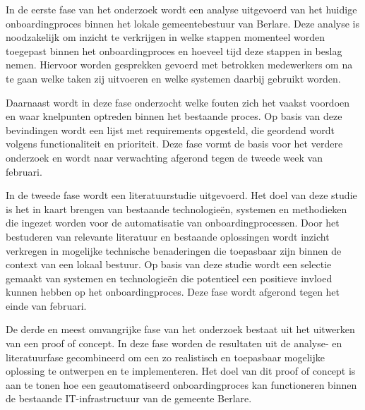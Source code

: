 


In de eerste fase van het onderzoek wordt een analyse uitgevoerd van het huidige onboardingproces binnen het lokale gemeentebestuur van Berlare. Deze analyse is noodzakelijk om inzicht te verkrijgen in welke stappen momenteel worden toegepast binnen het onboardingproces en hoeveel tijd deze stappen in beslag nemen. Hiervoor worden gesprekken gevoerd met betrokken medewerkers om na te gaan welke taken zij uitvoeren en welke systemen daarbij gebruikt worden.

Daarnaast wordt in deze fase onderzocht welke fouten zich het vaakst voordoen en waar knelpunten optreden binnen het bestaande proces. Op basis van deze bevindingen wordt een lijst met requirements opgesteld, die geordend wordt volgens functionaliteit en prioriteit. Deze fase vormt de basis voor het verdere onderzoek en wordt naar verwachting afgerond tegen de tweede week van februari.

In de tweede fase wordt een literatuurstudie uitgevoerd. Het doel van deze studie is het in kaart brengen van bestaande technologieën, systemen en methodieken die ingezet worden voor de automatisatie van onboardingprocessen. Door het bestuderen van relevante literatuur en bestaande oplossingen wordt inzicht verkregen in mogelijke technische benaderingen die toepasbaar zijn binnen de context van een lokaal bestuur. Op basis van deze studie wordt een selectie gemaakt van systemen en technologieën die potentieel een positieve invloed kunnen hebben op het onboardingproces. Deze fase wordt afgerond tegen het einde van februari.

De derde en meest omvangrijke fase van het onderzoek bestaat uit het uitwerken van een proof of concept. In deze fase worden de resultaten uit de analyse- en literatuurfase gecombineerd om een zo realistisch en toepasbaar mogelijke oplossing te ontwerpen en te implementeren. Het doel van dit proof of concept is aan te tonen hoe een geautomatiseerd onboardingproces kan functioneren binnen de bestaande IT-infrastructuur van de gemeente Berlare.

